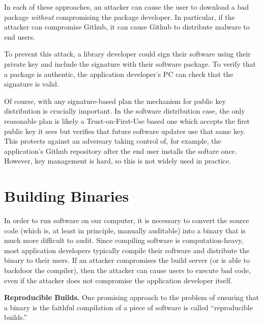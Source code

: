 \documentclass[
  letterpaper,
]{scrbook}
\theoremstyle{definition}
\theoremstyle{plain}
\theoremstyle{plain}
\theoremstyle{remark}
\begin{document}
In each of these approaches, an attacker can cause the user to download
a bad package \emph{without} compromising the package developer. In
particular, if the attacker can compromise Github, it can cause Github
to distribute malware to end users.

To prevent this attack, a library developer could sign their software
using their private key and include the signature with their software
package. To verify that a package is authentic, the application
developer's PC can check that the signature is valid.

Of course, with any signature-based plan the mechanism for public key
distribution is crucially important. In the software distribution case,
the only reasonable plan is likely a Trust-on-First-Use based one which
accepts the first public key it sees but verifies that future software
updates use that same key. This protects against an adversary taking
control of, for example, the application's Github repository after the
end user installs the softare once. However, key management is hard, so
this is not widely used in practice.

\section{Building Binaries}\label{building-binaries}

In order to run software on our computer, it is necessary to convert the
source code (which is, at least in principle, manually auditable) into a
binary that is much more difficult to audit. Since compiling software is
computation-heavy, most application developers typically compile their
software and distribute the binary to their users. If an attacker
compromises the build server (or is able to backdoor the compiler), then
the attacker can cause users to execute bad code, even if the attacker
does not compromise the application developer itself.


\textbf{Reproducible Builds.} One promising approach to the problem of
ensuring that a binary is the faithful compilation of a piece of
software is called ``reproducible builds.''
\end{document}
